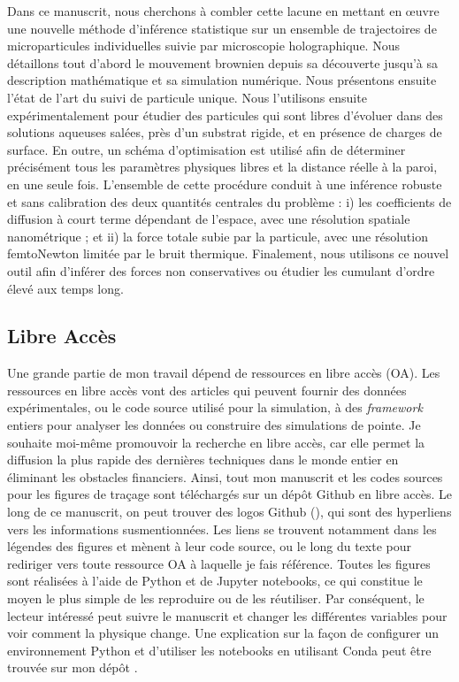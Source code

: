 Dans ce manuscrit, nous cherchons à combler cette lacune en mettant en œuvre une nouvelle méthode d'inférence statistique sur un ensemble de trajectoires de microparticules individuelles suivie par microscopie holographique. Nous détaillons tout d'abord le mouvement brownien depuis sa découverte jusqu'à sa description mathématique et sa simulation numérique. Nous présentons ensuite l'état de l'art du suivi de particule unique. Nous l'utilisons ensuite expérimentalement pour étudier des particules qui sont libres d'évoluer dans des solutions aqueuses salées, près d'un substrat rigide, et en présence de charges de surface. En outre, un schéma d'optimisation est utilisé afin de déterminer précisément tous les paramètres physiques libres et la distance réelle à la paroi, en une seule fois. L'ensemble de cette procédure conduit à une inférence robuste et sans calibration des deux quantités centrales du problème : i) les coefficients de diffusion à court terme dépendant de l'espace, avec une résolution spatiale nanométrique ; et ii) la force totale subie par la particule, avec une résolution femtoNewton limitée par le bruit thermique. Finalement, nous utilisons ce nouvel outil afin d'inférer des forces non conservatives ou étudier les cumulant d'ordre élevé aux temps long.



\subsection{Libre Accès}

Une grande partie de mon travail dépend de ressources en libre accès (OA). Les ressources en libre accès vont des articles qui peuvent fournir des données expérimentales, ou le code source utilisé pour la simulation, à des \textit{framework} entiers pour analyser les données ou construire des simulations de pointe. Je souhaite moi-même promouvoir la recherche en libre accès, car elle permet la diffusion la plus rapide des dernières techniques dans le monde entier en éliminant les obstacles financiers. Ainsi, tout mon manuscrit et les codes sources pour les figures de traçage sont téléchargés sur un dépôt Github en libre accès. Le long de ce manuscrit, on peut trouver des logos Github (\href{https://github.com/eXpensia/Ma-these/}{\faGithub}), qui sont des hyperliens vers les informations susmentionnées. Les liens se trouvent notamment dans les légendes des figures et mènent à leur code source, ou le long du texte pour rediriger vers toute ressource OA à laquelle je fais référence. Toutes les figures sont réalisées à l'aide de Python et de Jupyter notebooks, ce qui constitue le moyen le plus simple de les reproduire ou de les réutiliser. Par conséquent, le lecteur intéressé peut suivre le manuscrit et changer les différentes variables pour voir comment la physique change.  Une explication sur la façon de configurer un environnement Python et d'utiliser les notebooks en utilisant Conda peut être trouvée sur mon dépôt \href{https://github.com/eXpensia/Ma-these/}{\faGithub}.




